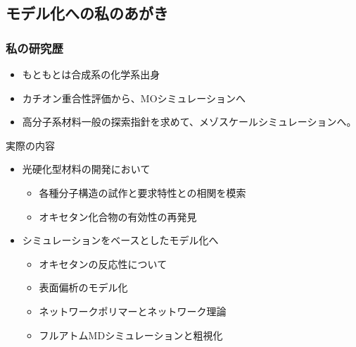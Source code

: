 \documentclass[12pt, dvipdfmx]{beamer}
\begin{document}
\subsection{モデル化への私のあがき}
\begin{frame}
    \frametitle{私の研究歴}
    \begin{itemize}
        \item もともとは合成系の化学系出身
        \item カチオン重合性評価から、MOシミュレーションへ
        \item 高分子系材料一般の探索指針を求めて、メゾスケールシミュレーションへ。
    \end{itemize}
        \begin{block}{実際の内容}
            \begin{itemize}
                \item 光硬化型材料の開発において
                \begin{itemize}
                    \item 各種分子構造の試作と要求特性との相関を模索
                    \item オキセタン化合物の有効性の再発見
                \end{itemize}
                \item シミュレーションをベースとしたモデル化へ
                \begin{itemize}
                    \item オキセタンの反応性について
                    \item 表面偏析のモデル化
                    \item ネットワークポリマーとネットワーク理論
                    \item フルアトムMDシミュレーションと粗視化
                \end{itemize}
            \end{itemize}
        \end{block}
\end{frame}
\end{document}
